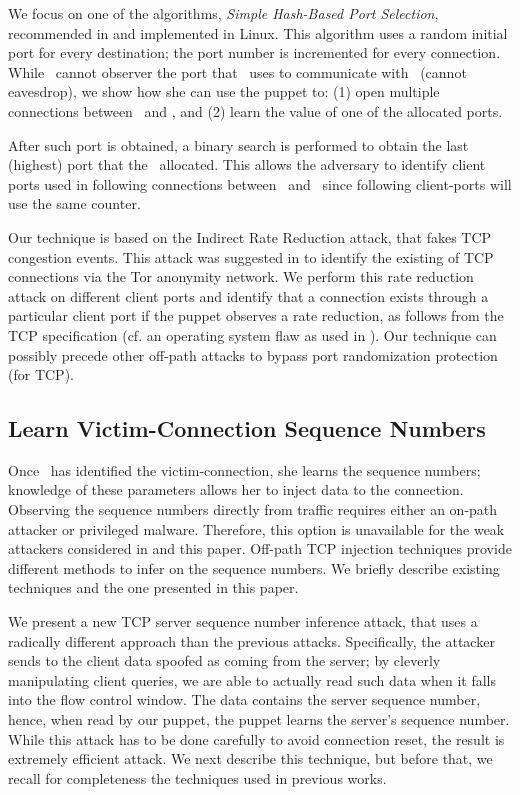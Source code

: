 \documentclass[conference]{IEEEtran}
\begin{document}
We focus on one of the algorithms, {\em Simple Hash-Based Port Selection}, recommended in \cite{rfc6056} and implemented in Linux. This algorithm uses a random initial port for every destination; the port number is incremented for every connection. While \mal\ cannot observer the port that \wini\ uses to communicate with \lin\ (cannot eavesdrop), we show how she can use the puppet to: (1) open multiple connections between \wini\ and \lin, and (2) learn the value of one of the allocated ports. 

After such port is obtained, a binary search is performed to obtain the last (highest) port that the \wini\ allocated. This allows the adversary to identify client ports used in following connections between \wini\ and \lin\ since following client-ports will use the same counter.

Our technique is based on the Indirect Rate Reduction attack, that fakes TCP congestion events. This attack was suggested in \cite{SpyingInTheDark} to identify the existing of TCP connections via the Tor anonymity network.
We perform this rate reduction attack on different client ports and identify that a connection exists through a particular client port if the puppet observes a rate reduction, as follows from the TCP specification (cf. an operating system flaw as used in \cite{woottcp}). Our technique can possibly precede other off-path attacks to bypass port randomization protection (for TCP). 


\subsection{Learn Victim-Connection Sequence Numbers}

Once \mal\ has identified the victim-connection, she learns the sequence numbers; knowledge of these parameters allows her to inject data to the connection. 
Observing the sequence numbers directly from traffic requires either an on-path attacker or privileged malware. Therefore, this option is unavailable for the weak attackers considered in \cite{lkm:phrack:07,woottcp,snptcp} and this paper. Off-path TCP injection techniques provide different methods to infer on the sequence numbers. We briefly describe existing techniques and the one presented in this paper.

We present a new TCP server sequence number inference attack, that uses a radically different approach than the previous attacks. Specifically, the attacker sends to the client  data spoofed as coming from the server; by cleverly manipulating client queries, we are able to actually read such data when it falls into the flow control window. The data contains the server sequence number, hence, when read by our puppet, the puppet learns the server's sequence number. While this attack has to be done carefully to avoid connection reset, the result is extremely efficient attack. We next describe this technique, but before that, we recall for completeness the techniques used in previous works. 
\end{document}

